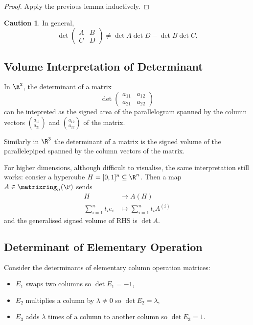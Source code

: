 \documentclass[a4paper]{article}
\newcommand*{\M}{\matrixring}
\theoremstyle{definition}
\newtheorem*{caution}{Caution}
\begin{document}
\begin{proof}
  Apply the previous lemma inductively.
\end{proof}

\begin{caution}
  In general,
  \[
    \det
    \begin{pmatrix}
      A & B \\
      C & D
    \end{pmatrix}
    \neq \det A \det D - \det B \det C.
  \]
\end{caution}

\subsection{Volume Interpretation of Determinant}

In \(\R^2\), the determinant of a matrix
\[
  \det
  \begin{pmatrix}
    a_{11} & a_{12} \\
    a_{21} & a_{22} 
  \end{pmatrix}
\]
can be intepreted as the signed area of the parallelogram spanned by the column vectors \(\binom{a_{11}}{a_{21}}\) and \(\binom{a_{12}}{a_{22}}\) of the matrix.
    
Similarly in \(\R^3\) the determinant of a matrix is the signed volume of the parallelepiped spanned by the column vectors of the matrix.

For higher dimensions, although difficult to visualise, the same interpretation still works: consier a hypercube \(H = [0, 1]^n \subseteq \R^n\). Then a map \(A \in \M_n(\F)\) sends
\begin{align*}
  H &\to A(H) \\
  \sum_{i = 1}^{n} t_ie_i &\mapsto \sum_{i = 1}^{n}t_i A^{(i)}
\end{align*}
and the generalised signed volume of RHS is \(\det A\).

\subsection{Determinant of Elementary Operation}

Consider the determinants of elementary column operation matrices:
\begin{itemize}
\item \(E_1\) swaps two columns so \(\det E_1 = -1\),
\item \(E_2\) multiplies a column by \(\lambda \neq 0\) so \(\det E_2 = \lambda\),
\item \(E_3\) adds \(\lambda\) times of a column to another column so \(\det E_3 = 1\).
\end{itemize}
\end{document}

